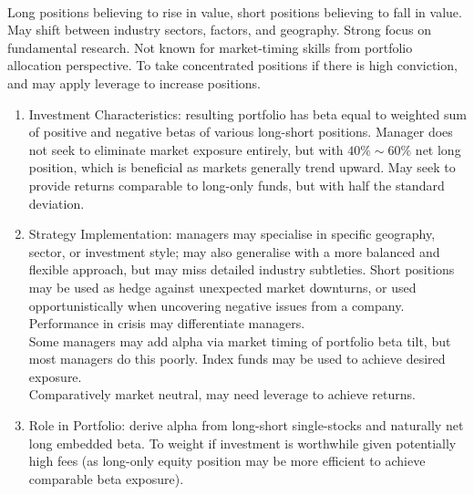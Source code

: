 \begin{remark} \\
Long positions believing to rise in value, short positions believing to fall in value. May shift between industry sectors, factors, and geography. Strong focus on fundamental research. Not known for market-timing skills from portfolio allocation perspective. To take concentrated positions if there is high conviction, and may apply leverage to increase positions.
\begin{enumerate}[label=\roman*.]
\setlength{\itemsep}{0pt}
\item Investment Characteristics: resulting portfolio has beta equal to weighted sum of positive and negative betas of various long-short positions. Manager does not seek to eliminate market exposure entirely, but with $40\% \sim 60\%$ net long position, which is beneficial as markets generally trend upward. May seek to provide returns comparable to long-only funds, but with half the standard deviation.
\item Strategy Implementation: managers may specialise in specific geography, sector, or investment style; may also generalise with a more balanced and flexible approach, but may miss detailed industry subtleties. Short positions may be used as hedge against unexpected market downturns, or used opportunistically when uncovering negative issues from a company. Performance in crisis may differentiate managers.\\
Some managers may add alpha via market timing of portfolio beta tilt, but most managers do this poorly. Index funds may be used to achieve desired exposure.\\
Comparatively market neutral, may need leverage to achieve returns.
\item Role in Portfolio: derive alpha from long-short single-stocks and naturally net long embedded beta. To weight if investment is worthwhile given potentially high fees (as long-only equity position may be more efficient to achieve comparable beta exposure).
\end{enumerate}
\end{remark}

